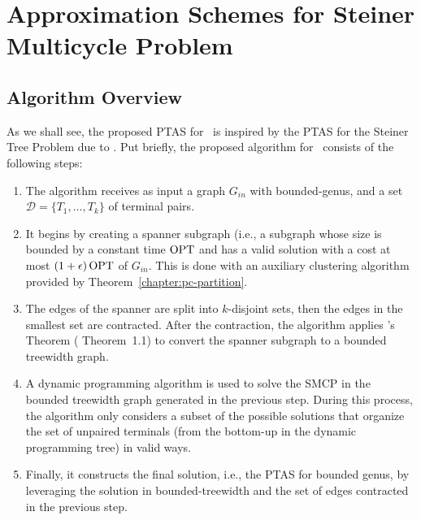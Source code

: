 \chapter{Approximation Schemes for Steiner Multicycle Problem}
\label{chapter:apx_schemes_for_smcp}


\section{Algorithm Overview}

As we shall see, the proposed PTAS for \steinercycle\ is inspired by the PTAS for the Steiner Tree Problem due to \cite{Bateni}. Put briefly, the proposed algorithm for \steinercycle\ consists of the following steps:

\begin{enumerate}
    \item The algorithm receives as input a graph \(G_{in}\) with bounded-genus, and a set \(\mathcal{D} = \{T_1, \dots, T_k\}\) of terminal pairs.

    \item It begins by creating a spanner subgraph (i.e., a subgraph whose size is bounded by a constant time \(\operatorname{\textrm{OPT}}\) and has a valid solution with a cost at most \((1 + \epsilon) \operatorname{\textrm{OPT}}\) of \(G_{in}\). This is done with an auxiliary clustering algorithm provided by Theorem~\ref{chapter:pc-partition}.
    
    \item The edges of the spanner are split into \(k\)-disjoint sets, then the edges in the smallest set are contracted. After the contraction, the algorithm applies \citeauthor{Demaine2010}'s Theorem (\cite{Demaine2010} Theorem~1.1) to convert the spanner subgraph to a bounded treewidth graph.

    \item A dynamic programming algorithm is used to solve the SMCP in the bounded treewidth graph generated in the previous step. During this process, the algorithm only considers a subset of the possible solutions that organize the set of unpaired terminals (from the bottom-up in the dynamic programming tree) in valid ways.

    \item Finally, it constructs the final solution, i.e., the PTAS for bounded genus, by leveraging the solution in bounded-treewidth and the set of edges contracted in the previous step.
\end{enumerate}

